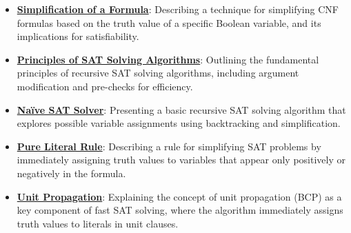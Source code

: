 \documentclass{article}%
\begin{document}
\begin{itemize}[leftmargin=*]
\item \href{https://purdue.brightspace.com/d2l/common/assets/pdfjs-d2l-dist/1.0.14-legacy/web/viewer.html?file=\%2Fcontent\%2Fenforced\%2F1095467-wl.202510.CS.24300.001\%2F15L2-SAT.pdf\%3Fou\%3D1095467\&lang=en-us\&container=d2l-fileviewer-rendered-pdf\&fullscreen=d2l-fileviewer-rendered-pdf-dialog\&height=667#page=15}{\textbf{Simplification of a Formula}}: Describing a technique for simplifying CNF formulas based on the truth value of a specific Boolean variable, and its implications for satisfiability.%
\item \href{https://purdue.brightspace.com/d2l/common/assets/pdfjs-d2l-dist/1.0.14-legacy/web/viewer.html?file=\%2Fcontent\%2Fenforced\%2F1095467-wl.202510.CS.24300.001\%2F15L2-SAT.pdf\%3Fou\%3D1095467\&lang=en-us\&container=d2l-fileviewer-rendered-pdf\&fullscreen=d2l-fileviewer-rendered-pdf-dialog\&height=667#page=17}{\textbf{Principles of SAT Solving Algorithms}}: Outlining the fundamental principles of recursive SAT solving algorithms, including argument modification and pre-checks for efficiency.%
\item \href{https://purdue.brightspace.com/d2l/common/assets/pdfjs-d2l-dist/1.0.14-legacy/web/viewer.html?file=\%2Fcontent\%2Fenforced\%2F1095467-wl.202510.CS.24300.001\%2F15L2-SAT.pdf\%3Fou\%3D1095467\&lang=en-us\&container=d2l-fileviewer-rendered-pdf\&fullscreen=d2l-fileviewer-rendered-pdf-dialog\&height=667#page=18}{\textbf{Naïve SAT Solver}}: Presenting a basic recursive SAT solving algorithm that explores possible variable assignments using backtracking and simplification.%
\item \href{https://purdue.brightspace.com/d2l/common/assets/pdfjs-d2l-dist/1.0.14-legacy/web/viewer.html?file=\%2Fcontent\%2Fenforced\%2F1095467-wl.202510.CS.24300.001\%2F15L2-SAT.pdf\%3Fou\%3D1095467\&lang=en-us\&container=d2l-fileviewer-rendered-pdf\&fullscreen=d2l-fileviewer-rendered-pdf-dialog\&height=667#page=19}{\textbf{Pure Literal Rule}}: Describing a rule for simplifying SAT problems by immediately assigning truth values to variables that appear only positively or negatively in the formula.%
\item \href{https://purdue.brightspace.com/d2l/common/assets/pdfjs-d2l-dist/1.0.14-legacy/web/viewer.html?file=\%2Fcontent\%2Fenforced\%2F1095467-wl.202510.CS.24300.001\%2F15L2-SAT.pdf\%3Fou\%3D1095467\&lang=en-us\&container=d2l-fileviewer-rendered-pdf\&fullscreen=d2l-fileviewer-rendered-pdf-dialog\&height=667#page=20}{\textbf{Unit Propagation}}: Explaining the concept of unit propagation (BCP) as a key component of fast SAT solving, where the algorithm immediately assigns truth values to literals in unit clauses.%

\end{itemize}
\end{document}
